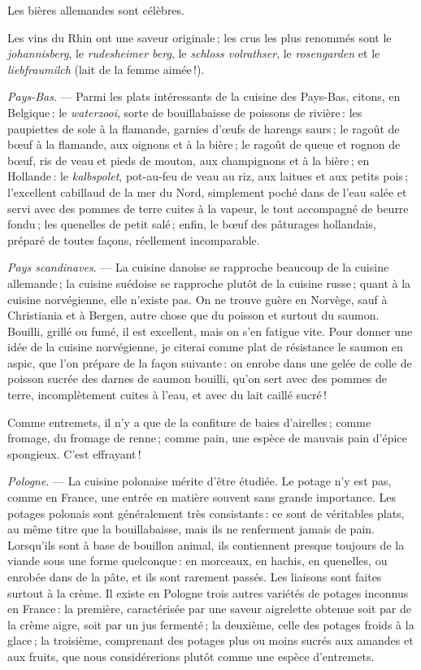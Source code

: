 Les bières allemandes sont célèbres.

Les vins du Rhin ont une saveur originale ; les crus les plus renommés sont le
\textit{johannisberg}, le \textit{rudesheimer berg}, le \textit{schloss
volrathser}, le \textit{rosengarden} et le \textit{liebfraumilch} (lait de la
femme aimée !).

\sk

\textit{Pays-Bas}. — Parmi les plats intéressants de la cuisine des Pays-Bas,
citons, en Belgique : le \textit{waterzooi}, sorte de bouillabaisse de poissons
de rivière : les paupiettes de sole à la flamande, garnies d'œufs de harengs
saurs ; le ragoût de bœuf à la flamande, aux oignons et à la bière ; le ragoût
de queue et rognon de bœuf, ris de veau et pieds de mouton, aux champignons et
à la bière ; en Hollande : le \textit{kalbspolet}, pot-au-feu de veau au riz,
aux laitues et aux petits pois ; l'excellent cabillaud de la mer du Nord,
simplement poché dans de l'eau salée et servi avec des pommes de terre cuites
à la vapeur, le tout accompagné de beurre fondu ; les quenelles de petit salé ;
enfin, le bœuf des pâturages hollandais, préparé de toutes façons, réellement
incomparable.

\sk

\textit{Pays scandinaves}. — La cuisine danoise se rapproche beaucoup de la
cuisine allemande ; la cuisine suédoise se rapproche plutôt de la cuisine
russe ; quant à la cuisine norvégienne, elle n'existe pas. On ne trouve guère
en Norvège, sauf à Christiania et à Bergen, autre chose que du poisson et
surtout du saumon. Bouilli, grillé ou fumé, il est excellent, mais on s’en
fatigue vite. Pour donner une idée de la cuisine norvégienne, je citerai comme
plat de résistance le saumon en aspic, que l'on prépare de la façon suivante :
on enrobe dans une gelée de colle de poisson sucrée des darnes de saumon
bouilli, qu'on sert avec des pommes de terre, incomplètement cuites à l'eau, et
avec du lait caillé sucré !

Comme entremets, il n'y a que de la confiture de baies d'airelles ; comme
fromage, du fromage de renne ; comme pain, une espèce de mauvais pain d'épice
spongieux. C'est effrayant !

\sk

\textit{Pologne}. — La cuisine polonaise mérite d'être étudiée. Le potage n'y
est pas, comme en France, une entrée en matière souvent sans grande importance.
Les potages polonais sont généralement très consistants : ce sont de véritables
plats, au même titre que la bouillabaisse, mais ils ne renferment jamais de
pain. Lorsqu'ils sont à base de bouillon animal, ils contiennent presque
toujours de la viande sous une forme quelconque : en morceaux, en hachis, en
quenelles, ou enrobée dans de la pâte, et ils sont rarement passés. Les
liaisons sont faites surtout à la crème. Il existe en Pologne trois autres
variétés de potages inconnus en France : la première, caractérisée par une
saveur aigrelette obtenue soit par de la crème aigre, soit par un jus
fermenté ; la deuxième, celle des potages froids à la glace ; la troisième,
comprenant des potages plus ou moins sucrés aux amandes et aux fruits, que nous
considérerions plutôt comme une espèce d'entremets.

